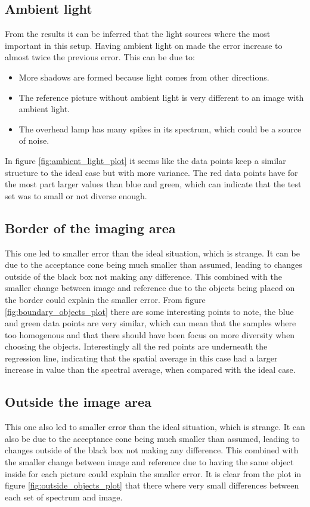 \subsection{Ambient light}
From the results it can be inferred that the light sources where the most important in this setup. Having ambient light on made the error increase to almost twice the previous error. This can be due to: 
\begin{itemize}
    \item More shadows are formed because light comes from other directions. 
    \item The reference picture without ambient light is very different to an image with ambient light. 
    \item The overhead lamp has many spikes in its spectrum, which could be a source of noise. 
\end{itemize}
In figure \ref{fig:ambient_light_plot} it seems like the data points keep a similar structure to the ideal case but with more variance. The red data points have for the most part larger values than blue and green, which can indicate that the test set was to small or not diverse enough.


\subsection{Border of the imaging area} 
This one led to smaller error than the ideal situation, which is strange. It can be due to the acceptance cone being much smaller than assumed, leading to changes outside of the black box not making any difference. This combined with the smaller change between image and reference due to the objects being placed on the border could explain the smaller error. From figure \ref{fig:boundary_objects_plot} there are some interesting points to note, the blue and green data points are very similar, which can mean that the samples where too homogenous and that there should have been focus on more diversity when choosing the objects. Interestingly all the red points are underneath the regression line, indicating that the spatial average in this case had a larger increase in value than the spectral average, when compared with the ideal case. 

\subsection{Outside the image area}
This one also led to smaller error than the ideal situation, which is strange. It can also be due to the acceptance cone being much smaller than assumed, leading to changes outside of the black box not making any difference. This combined with the smaller change between image and reference due to having the same object inside for each picture could explain the smaller error. It is clear from the plot in figure \ref{fig:outside_objects_plot} that there where very small differences between each set of spectrum and image. 

